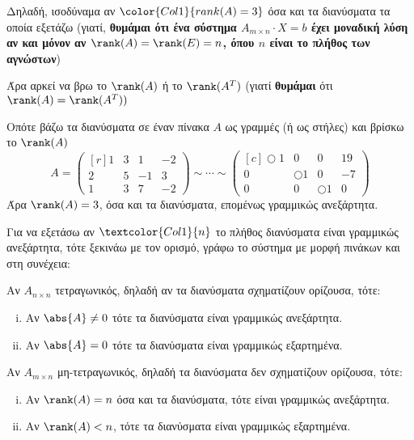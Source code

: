 Δηλαδή, ισοδύναμα αν $ \color{Col1}{rank(A) = 3} $ όσα και τα διανύσματα 
τα οποία εξετάζω (γιατί, \textbf{θυμάμαι ότι ένα σύστημα $ A_{m \times n} \cdot X = b $ 
  έχει μοναδική λύση αν και μόνον αν $ \rank(A) = \rank(E) = n $, όπου $n$ είναι το 
πλήθος των αγνώστων})

Άρα αρκεί να βρω το $ \rank(A) $ ή το $ \rank(A^{T}) $ (γιατί \textbf{θυμάμαι} ότι 
$ \rank(A) = \rank(A^{T})) $ 

Οπότε βάζω τα διανύσματα σε έναν πίνακα $A$ ως γραμμές (ή ως στήλες) και βρίσκω το 
$ \rank(A) $
\[
  A = 
  \begin{pmatrix*}[r]
    1 & 3 & 1 &-2 \\
    2 & 5 & -1 & 3 \\
    1 & 3 & 7 &  -2
  \end{pmatrix*} \sim \cdots \sim 
  \begin{pmatrix*}[c]
    \Circle{1} & 0 & 0 & 19 \\
    0 & \Circle{1} & 0 & -7 \\
    0 & 0 & \Circle{1} & 0
  \end{pmatrix*}
\] 
Άρα $ \rank(A) = 3 $, όσα και τα διανύσματα, επομένως γραμμικώς ανεξάρτητα.

\begin{concl}
  Για να εξετάσω αν $\textcolor{Col1}{n}$ το πλήθος διανύσματα είναι γραμμικώς 
  ανεξάρτητα, τότε ξεκινάω με τον ορισμό, γράφω το σύστημα με μορφή 
  πινάκων και στη συνέχεια:
  \begin{myitemize}
    \item Αν $A_{n \times n}$ τετραγωνικός, δηλαδή αν τα διανύσματα σχηματίζουν 
      ορίζουσα, τότε: 
      \begin{enumerate}[i)]
        \item Αν $ \abs{A} \neq 0 $ τότε τα διανύσματα είναι γραμμικώς ανεξάρτητα.
        \item Αν $ \abs{A} = 0 $ τότε τα διανύσματα είναι γραμμικώς εξαρτημένα.
      \end{enumerate}
    \item Αν $A_{m\times n}$ μη-τετραγωνικός, δηλαδή τα διανύσματα δεν σχηματίζουν
      ορίζουσα, τότε:
      \begin{enumerate}[i)]
        \item Αν $ \rank(A) = n $ όσα και τα διανύσματα, τότε είναι γραμμικώς ανεξάρτητα.
        \item Αν $ \rank(A) < n $, τότε τα διανύσματα είναι γραμμικώς εξαρτημένα.
      \end{enumerate}
  \end{myitemize}
\end{concl}

